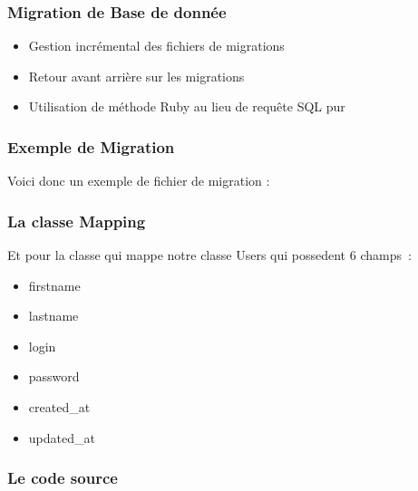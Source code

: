 \documentclass{beamer}
\begin{document}
\begin{frame}
    \frametitle{Migration de Base de donnée}
    \begin{itemize}
        \item Gestion incrémental des fichiers de migrations
        \item Retour avant arrière sur les migrations
        \item Utilisation de méthode Ruby au lieu de requête SQL pur
    \end{itemize}
\end{frame}
\begin{frame}
    \frametitle{Exemple de Migration}

    Voici donc un exemple de fichier de migration :


    \begin{center}
        
    \end{center}
\end{frame}

\begin{frame}
    \frametitle{La classe Mapping}
    Et pour la classe qui mappe notre classe Users qui possedent 6 champs~:

    \begin{itemize}
        \item firstname
        \item lastname
        \item login
        \item password
        \item created\_at
        \item updated\_at
    \end{itemize}
\end{frame}

\begin{frame}
    \frametitle{Le code source}
    
    \begin{center}
        
    \end{center}

\end{frame}
\end{document}
